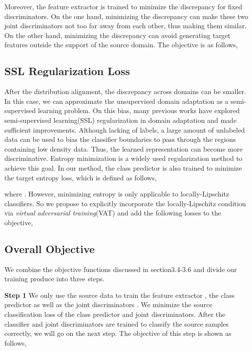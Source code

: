 \documentclass{ecai}
\begin{document}
Moreover, the feature extractor is trained to minimize the discrepancy for fixed discriminators. On the one hand, minimizing the discrepancy can make these two joint discriminators not too far away from each other, thus making them similar. On the other hand, minimizing the discrepancy can avoid generating target features outside the support of the source domain\cite{b24}. The objective is as follows,


\subsection{SSL Regularization Loss}
After the distribution alignment, the discrepancy across domains can be smaller. In this case, we can approximate the unsupervised domain adaptation as a semi-supervised learning problem. On this bias, many previous works have explored semi-supervised learning(SSL)  regularization in  domain adaptation\cite{b17,b30} and made sufficient improvements. Although lacking of labels, a large amount of unlabeled data can be used to bias the classifier boundaries to pass through the regions containing low density data. Thus, the learned representation can become more discriminative. Entropy minimization is a widely used  regularization method to achieve this goal. In our method, the class predictor is also trained to minimize the target entropy loss, which is defined as follows,

where . However, minimizing entropy is only applicable to locally-Lipschitz classifiers\cite{b21}. So we propose to explicitly incorporate the locally-Lipschitz condition via {\emph{virtual adversarial training}}(VAT) and add the following losses to the objective,




\subsection{Overall Objective}

We combine the objective functions discussed in section3.4-3.6 and divide our training produce into three steps.

\textbf{Step 1} We only use the source data to train the feature extractor , the class predictor  as well as the joint discriminators .  We minimize the source classification loss of the class predictor and joint discriminators. After the classifier and joint discriminators are trained to classify the source samples correctly, we will go on the next step. The objective of this step is shown as follows,
\end{document}
